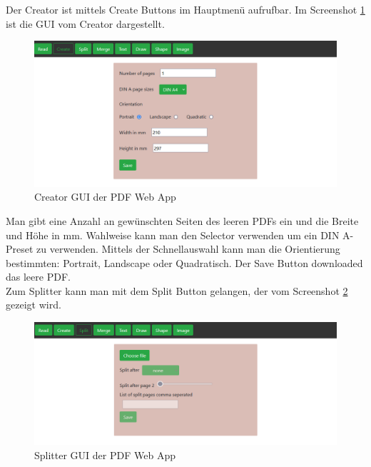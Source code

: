 Der Creator ist mittels Create Buttons im Hauptmenü aufrufbar. Im Screenshot \ref{fig:creator} ist die GUI vom Creator dargestellt. 

\begin{figure}[!htb]
	\centering
	\includegraphics[width=1\textwidth]{"images/creator.png"}
	\caption{Creator GUI der PDF Web App}
	\label{fig:creator}
\end{figure}

Man gibt eine Anzahl an gewünschten Seiten des leeren PDFs ein und die Breite und Höhe in mm. Wahlweise kann man den Selector verwenden um ein DIN A-Preset zu verwenden. Mittels der Schnellauswahl kann man die Orientierung bestimmten: Portrait, Landscape oder Quadratisch. Der Save Button downloaded das leere PDF. \\
Zum Splitter kann man mit dem Split Button gelangen, der vom Screenshot \ref{fig:splitter} gezeigt wird.

\begin{figure}[!htb]
	\centering
	\includegraphics[width=1\textwidth]{"images/splitter.png"}
	\caption{Splitter GUI der PDF Web App}
	\label{fig:splitter}
\end{figure}